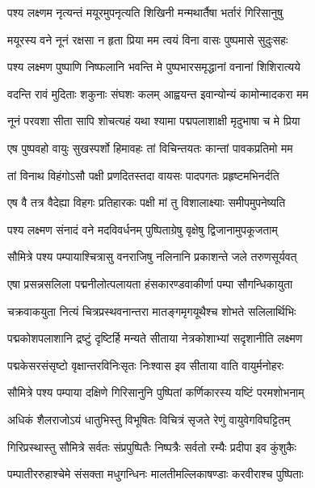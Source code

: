 \twolineshloka
{पश्य लक्ष्णम नृत्यन्तं मयूरमुपनृत्यति}
{शिखिनी मन्मथार्तैषा भर्तारं गिरिसानुषु} %

\twolineshloka
{मयूरस्य वने नूनं रक्षसा न हृता प्रिया}
{मम त्वयं विना वासः पुष्पमासे सुदुःसहः} %

\twolineshloka
{पश्य लक्ष्मण पुष्पाणि निष्फलानि भवन्ति मे}
{पुष्पभारसमृद्धानां वनानां शिशिरात्यये} %

\twolineshloka
{वदन्ति रावं मुदिताः शकुनाः संघशः कलम्}
{आह्वयन्त इवान्योन्यं कामोन्मादकरा मम} %

\twolineshloka
{नूनं परवशा सीता सापि शोचत्यहं यथा}
{श्यामा पद्मपलाशाक्षी मृदुभाषा च मे प्रिया} %

\twolineshloka
{एष पुष्पवहो वायुः सुखस्पर्शो हिमावहः}
{तां विचिन्तयतः कान्तां पावकप्रतिमो मम} %

\twolineshloka
{तां विनाथ विहंगोऽसौ पक्षी प्रणदितस्तदा}
{वायसः पादपगतः प्रहृष्टमभिनर्दति} %

\twolineshloka
{एष वै तत्र वैदेह्या विहगः प्रतिहारकः}
{पक्षी मां तु विशालाक्ष्याः समीपमुपनेष्यति} %

\twolineshloka
{पश्य लक्ष्मण संनादं वने मदविवर्धनम्}
{पुष्पिताग्रेषु वृक्षेषु द्विजानामुपकूजताम्} %

\twolineshloka
{सौमित्रे पश्य पम्पायाश्चित्रासु वनराजिषु}
{नलिनानि प्रकाशन्ते जले तरुणसूर्यवत्} %

\twolineshloka
{एषा प्रसन्नसलिला पद्मनीलोत्पलायता}
{हंसकारण्डवाकीर्णा पम्पा सौगन्धिकायुता} %

\twolineshloka
{चक्रवाकयुता नित्यं चित्रप्रस्थवनान्तरा}
{मातङ्गमृगयूथैश्च शोभते सलिलार्थिभिः} %

\twolineshloka
{पद्मकोशपलाशानि द्रष्टुं दृष्टिर्हि मन्यते}
{सीताया नेत्रकोशाभ्यां सदृशानीति लक्ष्मण} %

\twolineshloka
{पद्मकेसरसंसृष्टो वृक्षान्तरविनिःसृतः}
{निःश्वास इव सीताया वाति वायुर्मनोहरः} %

\twolineshloka
{सौमित्रे पश्य पम्पाया दक्षिणे गिरिसानुनि}
{पुष्पितां कर्णिकारस्य यष्टिं परमशोभनाम्} %

\twolineshloka
{अधिकं शैलराजोऽयं धातुभिस्तु विभूषितः}
{विचित्रं सृजते रेणुं वायुवेगविघट्टितम्} %

\twolineshloka
{गिरिप्रस्थास्तु सौमित्रे सर्वतः संप्रपुष्पितैः}
{निष्पत्रैः सर्वतो रम्यैः प्रदीपा इव कुंशुकैः} %

\twolineshloka
{पम्पातीररुहाश्चेमे संसक्ता मधुगन्धिनः}
{मालतीमल्लिकाषण्डाः करवीराश्च पुष्पिताः} %


